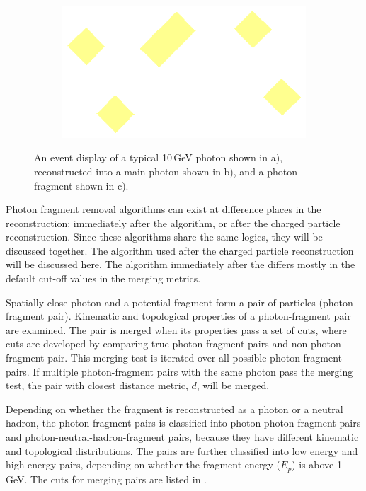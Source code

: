 \begin{figure}[tbph]
  \begin{subfigure}[b]{0.3\textwidth}
    \includegraphics[width=\textwidth]{photon/small}
    \caption{}
    \label{fig:photonEvtDspPhotonFragSmall}
  \end{subfigure}

\caption
{An event display of a typical 10\,GeV photon shown in a), reconstructed into a main photon shown in b), and a photon fragment shown in c). }
\label{fig:photonEvtDspPhotonFrag}
\end{figure}


Photon fragment removal algorithms can exist at difference places in the reconstruction: immediately after the \PhotonReconstruction algorithm, or after the charged particle reconstruction. Since these algorithms share the same logics, they will be discussed together. The algorithm used   after the charged particle reconstruction will be discussed here. The algorithm  immediately after the \PhotonReconstruction  differs mostly in the default cut-off values in the  merging metrics.

Spatially close photon and a potential fragment form a pair of particles (photon-fragment pair). Kinematic and topological properties of a photon-fragment pair are examined. The pair is merged when its properties pass a set of cuts, where cuts are developed by comparing true photon-fragment pairs and non photon-fragment pair. This merging test is iterated over all possible  photon-fragment pairs. If multiple photon-fragment pairs with the same photon pass the merging test, the pair with closest distance metric, $d$, will be merged.

Depending on whether the fragment is reconstructed as a photon or a neutral hadron, the photon-fragment pairs is classified into photon-photon-fragment pairs and photon-neutral-hadron-fragment pairs, because they have different kinematic and topological distributions. The pairs are further classified into low energy and high energy pairs, depending on whether the fragment energy ($E_p$) is above 1\,GeV. The cuts for merging pairs are listed in .


